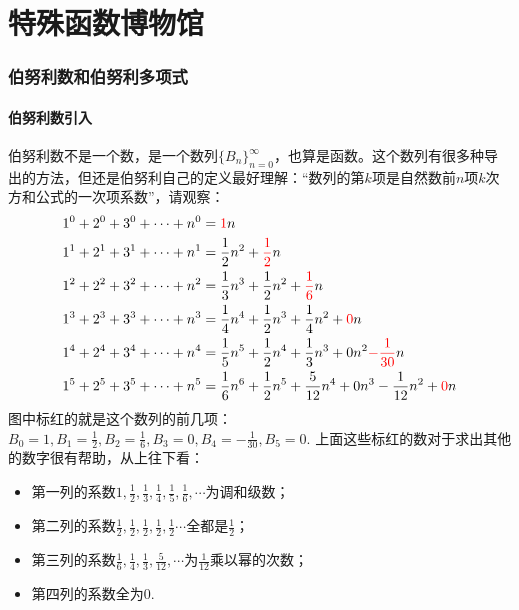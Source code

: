 \documentclass[main.tex]{subfiles}
\begin{document}
\part{特殊函数博物馆}
\setcounter{section}{0}

\section{伯努利数和伯努利多项式}

\subsection{伯努利数引入}

伯努利数不是一个数，是一个数列\(\{B_n\}_{n=0}^{\infty}\)，也算是函数。这个数列有很多种导出的方法，但还是伯努利自己的定义最好理解：“数列的第\(k\)项是自然数前\(n\)项\(k\)次方和公式的一次项系数”，请观察：
\begin{align*}
    1^0+2^0+3^0+ \cdots +n^0 &= {\color{red} 1}n \\
    1^1+2^1+3^1+ \cdots +n^1 &= \frac{1}{2}n^2+{\color{red} \frac{1}{2}}n \\
    1^2+2^2+3^2+ \cdots +n^2 &= \frac{1}{3}n^3+\frac{1}{2}n^2+{\color{red} \frac{1}{6}}n \\
    1^3+2^3+3^3+ \cdots +n^3 &= \frac{1}{4}n^4+\frac{1}{2}n^3+\frac{1}{4}n^2+{\color{red} 0}n \\
    1^4+2^4+3^4+ \cdots +n^4 &= \frac{1}{5}n^5+\frac{1}{2}n^4+\frac{1}{3}n^3+0n^2{\color{red} -\frac{1}{30}}n \\
    1^5+2^5+3^5+ \cdots +n^5 &= \frac{1}{6}n^6+\frac{1}{2}n^5+\frac{5}{12}n^4+0n^3-\frac{1}{12}n^2+{\color{red} 0}n
\end{align*}
图中标红的就是这个数列的前几项：\(\displaystyle{B_0=1, B_1=\frac{1}{2}, B_2=\frac{1}{6}, B_3=0, B_4=-\frac{1}{30}, B_5=0}\). 上面这些标红的数对于求出其他的数字很有帮助，从上往下看：
\begin{itemize}
    \item [] 第一列的系数\(\displaystyle{1, \frac{1}{2}, \frac{1}{3}, \frac{1}{4}, \frac{1}{5}, \frac 1 6, \cdots}\)为调和级数；
    \item [] 第二列的系数\(\displaystyle{\frac{1}{2}, \frac{1}{2}, \frac{1}{2}, \frac{1}{2}, \frac 1 2 \cdots}\)全都是\(\displaystyle{\frac{1}{2}}\)；
    \item [] 第三列的系数\(\displaystyle{\frac 1 6, \frac 1 4, \frac 1 3, \frac{5}{12}, \cdots}\)为\(\displaystyle{\frac{1}{12}}\)乘以幂的次数；
    \item [] 第四列的系数全为\(0\).
\end{itemize}
\end{document}
